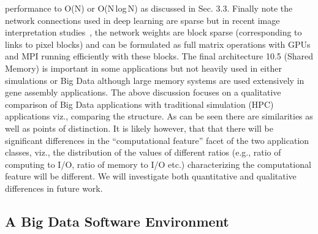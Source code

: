 \documentclass{acm_proc_article-sp}
\begin{document}
performance to O(N) or O(N\,log\,N) as discussed in Sec. 3.3. Finally note the
network connections used in deep learning are sparse but in recent image
interpretation studies~\cite{b7}, the network weights are block sparse
(corresponding to links to pixel blocks) and can be formulated as full matrix
operations with GPUs and MPI running efficiently with these blocks. The final
architecture 10.5 (Shared Memory) is important in some applications but not
heavily used in either simulations or Big Data although large memory systems
are used extensively in gene assembly applications. The above discussion
focuses on a qualitative comparison of Big Data applications with traditional
simulation (HPC) applications viz., comparing the structure. As can be seen
there are similarities as well as points of distinction. It is likely however,
that that there will be significant differences in the ``computational
feature'' facet of the two application classes, viz., the distribution of the
values of different ratios (e.g., ratio of computing to I/O, ratio of memory to
I/O etc.) characterizing the computational feature will be different. We will
investigate both quantitative and qualitative differences in future work.


\subsection{A Big Data Software Environment}


\end{document}
